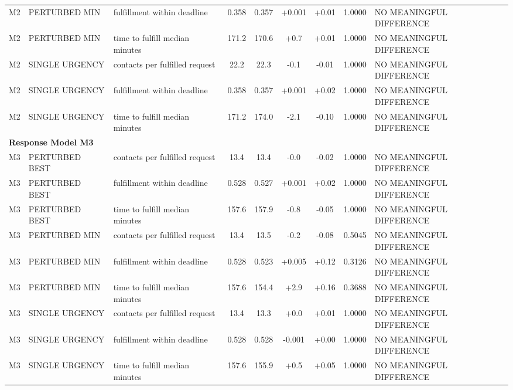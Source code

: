 \begin{table}[t]
\begin{tabular}{lllcccccl}
M2 & PERTURBED MIN & fulfillment within deadline & 0.358 & 0.357 & +0.001 & +0.01 & 1.0000 & NO MEANINGFUL DIFFERENCE \\
M2 & PERTURBED MIN & time to fulfill median minutes & 171.2 & 170.6 & +0.7 & +0.01 & 1.0000 & NO MEANINGFUL DIFFERENCE \\
M2 & SINGLE URGENCY & contacts per fulfilled request & 22.2 & 22.3 & -0.1 & -0.01 & 1.0000 & NO MEANINGFUL DIFFERENCE \\
M2 & SINGLE URGENCY & fulfillment within deadline & 0.358 & 0.357 & +0.001 & +0.02 & 1.0000 & NO MEANINGFUL DIFFERENCE \\
M2 & SINGLE URGENCY & time to fulfill median minutes & 171.2 & 174.0 & -2.1 & -0.10 & 1.0000 & NO MEANINGFUL DIFFERENCE \\
\midrule
\multicolumn{9}{l}{\textbf{Response Model M3}} \\
\midrule
M3 & PERTURBED BEST & contacts per fulfilled request & 13.4 & 13.4 & -0.0 & -0.02 & 1.0000 & NO MEANINGFUL DIFFERENCE \\
M3 & PERTURBED BEST & fulfillment within deadline & 0.528 & 0.527 & +0.001 & +0.02 & 1.0000 & NO MEANINGFUL DIFFERENCE \\
M3 & PERTURBED BEST & time to fulfill median minutes & 157.6 & 157.9 & -0.8 & -0.05 & 1.0000 & NO MEANINGFUL DIFFERENCE \\
M3 & PERTURBED MIN & contacts per fulfilled request & 13.4 & 13.5 & -0.2 & -0.08 & 0.5045 & NO MEANINGFUL DIFFERENCE \\
M3 & PERTURBED MIN & fulfillment within deadline & 0.528 & 0.523 & +0.005 & +0.12 & 0.3126 & NO MEANINGFUL DIFFERENCE \\
M3 & PERTURBED MIN & time to fulfill median minutes & 157.6 & 154.4 & +2.9 & +0.16 & 0.3688 & NO MEANINGFUL DIFFERENCE \\
M3 & SINGLE URGENCY & contacts per fulfilled request & 13.4 & 13.3 & +0.0 & +0.01 & 1.0000 & NO MEANINGFUL DIFFERENCE \\
M3 & SINGLE URGENCY & fulfillment within deadline & 0.528 & 0.528 & -0.001 & +0.00 & 1.0000 & NO MEANINGFUL DIFFERENCE \\
M3 & SINGLE URGENCY & time to fulfill median minutes & 157.6 & 155.9 & +0.5 & +0.05 & 1.0000 & NO MEANINGFUL DIFFERENCE \\
\bottomrule
\end{tabular}
\end{table}
